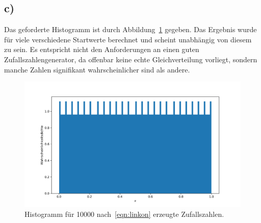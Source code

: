 \documentclass[a4paper, 11pt]{article}
\begin{document}
\subsection*{c)}
Das geforderte Histogramm ist durch Abbildung~\ref{fig:a9c} gegeben. Das Ergebnis wurde für viele verschiedene Startwerte berechnet und scheint unabhängig von diesem zu sein. Es entspricht nicht den Anforderungen an einen guten Zufallszahlengenerator, da offenbar keine echte Gleichverteilung vorliegt, sondern manche Zahlen signifikant wahrscheinlicher sind als andere.
\begin{figure}
    \centering
    \includegraphics[width=\textwidth]{../A09/A9c.png}
    \caption{Histogramm für 10000 nach~\ref{eqn:linkon} erzeugte Zufallszahlen. }
    \label{fig:a9c}
\end{figure}
\FloatBarrier
\end{document}
